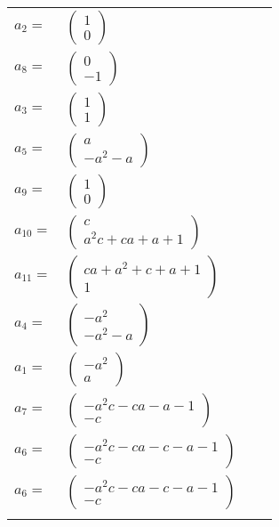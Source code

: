 \documentclass[1p]{elsarticle_modified}
\theoremstyle{definition}
\begin{document}
\begin{tabular}{m{7pt} m{180pt} m{7pt} m{180pt} }
\flushright $a_{2}=$&$\begin{pmatrix}1\\0\end{pmatrix}$ \\
\flushright $a_{8}=$&$\begin{pmatrix}0\\-1\end{pmatrix}$ \\
\flushright $a_{3}=$&$\begin{pmatrix}1\\1\end{pmatrix}$ \\
\flushright $a_{5}=$&$\begin{pmatrix}a\\- a^2- a\end{pmatrix}$ \\
\flushright $a_{9}=$&$\begin{pmatrix}1\\0\end{pmatrix}$ \\
\flushright $a_{10}=$&$\begin{pmatrix}c\\a^2 c+c a+a+1\end{pmatrix}$ \\
\flushright $a_{11}=$&$\begin{pmatrix}c a+a^2+c+a+1\\1\end{pmatrix}$ \\
\flushright $a_{4}=$&$\begin{pmatrix}- a^2\\- a^2- a\end{pmatrix}$ \\
\flushright $a_{1}=$&$\begin{pmatrix}- a^2\\a\end{pmatrix}$ \\
\flushright $a_{7}=$&$\begin{pmatrix}- a^2 c- c a- a-1\\- c\end{pmatrix}$ \\
\flushright $a_{6}=$&$\begin{pmatrix}- a^2 c- c a- c- a-1\\- c\end{pmatrix}$\\ \flushright $a_{6}=$&$\begin{pmatrix}- a^2 c- c a- c- a-1\\- c\end{pmatrix}$\\&\end{tabular}
\end{document}
